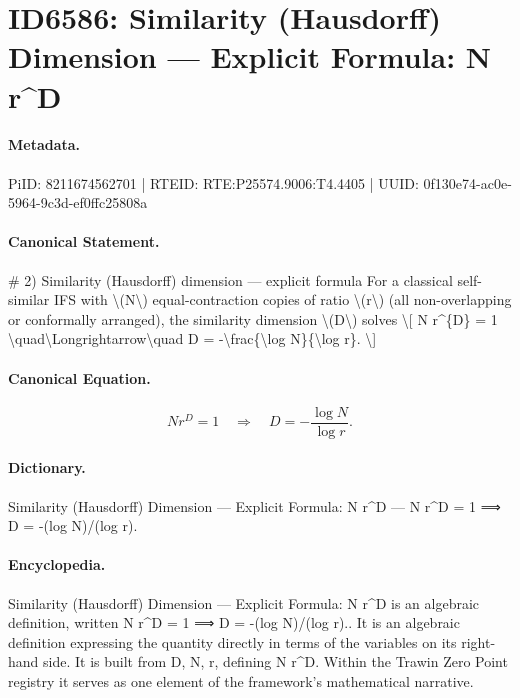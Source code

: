 \section*{ID6586: Similarity (Hausdorff) Dimension — Explicit Formula: N r\textasciicircum{}D}
\paragraph{Metadata.}
PiID: 8211674562701 | RTEID: RTE:P25574.9006:T4.4405 | UUID: 0f130e74-ac0e-5964-9c3d-ef0ffc25808a

\paragraph{Canonical Statement.}
\# 2) Similarity (Hausdorff) dimension — explicit formula For a classical self-similar IFS with \textbackslash{}(N\textbackslash{}) equal-contraction copies of ratio \textbackslash{}(r\textbackslash{}) (all non-overlapping or conformally arranged), the similarity dimension \textbackslash{}(D\textbackslash{}) solves \textbackslash{}[ N r\textasciicircum{}\{D\} = 1 \textbackslash{}quad\textbackslash{}Longrightarrow\textbackslash{}quad D = -\textbackslash{}frac\{\textbackslash{}log N\}\{\textbackslash{}log r\}. \textbackslash{}]

\paragraph{Canonical Equation.}
\[
N r^{D} = 1 \quad\Longrightarrow\quad D = -\frac{\log N}{\log r}.
\]

\paragraph{Dictionary.}
Similarity (Hausdorff) Dimension — Explicit Formula: N r\textasciicircum{}D — N r\textasciicircum{}D = 1 ⟹ D = -(log N)/(log r).

\paragraph{Encyclopedia.}
Similarity (Hausdorff) Dimension — Explicit Formula: N r\textasciicircum{}D is an algebraic definition, written N r\textasciicircum{}D = 1 ⟹ D = -(log N)/(log r).. It is an algebraic definition expressing the quantity directly in terms of the variables on its right-hand side. It is built from D, N, r, defining N r\textasciicircum{}D. Within the Trawin Zero Point registry it serves as one element of the framework's mathematical narrative.
